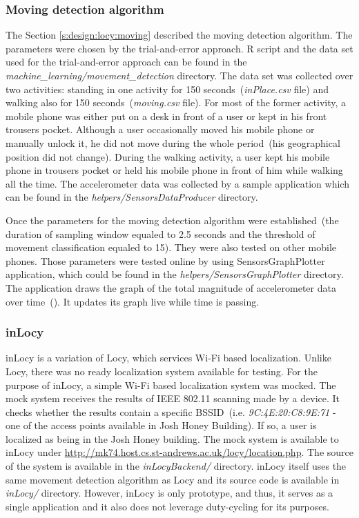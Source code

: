 \subsubsection{Moving detection algorithm}
\label{s:implementation:moving}
\hspace{10pt} The Section \ref{s:design:locy:moving} described the moving detection algorithm. The parameters were chosen by the trial-and-error approach. R script and the data set used for the trial-and-error approach can be found in the \textit{machine\_learning/movement\_detection} directory. The data set was collected over two activities: standing in one activity for 150 seconds\ (\textit{inPlace.csv} file) and walking also for 150 seconds\ (\textit{moving.csv} file). For most of the former activity, a mobile phone was either put on a desk in front of a user or kept in his front trousers pocket. Although a user occasionally moved his mobile phone or manually unlock it, he did not move during the whole period\ (his geographical position did not change). During the walking activity, a user kept his mobile phone in trousers pocket or held his mobile phone in front of him while walking all the time. The accelerometer data was collected by a sample application which can be found in the \textit{helpers/SensorsDataProducer} directory.

Once the parameters for the moving detection algorithm were established\ (the duration of sampling window equaled to 2.5 seconds and the threshold of movement classification equaled to 15). They were also tested on other mobile phones. Those parameters were tested online by using SensorsGraphPlotter application, which could be found in the \textit{helpers/SensorsGraphPlotter} directory. The application draws the graph of the total magnitude of accelerometer data over time\ (). It updates its graph live while time is passing.


\subsubsection{inLocy}
\hspace{10pt} inLocy is a variation of Locy, which services Wi-Fi based localization. Unlike Locy, there was no ready localization system available for testing. For the purpose of inLocy, a simple Wi-Fi based localization system was mocked. The mock system receives the results of IEEE 802.11 scanning made by a device. It checks whether the results contain a specific BSSID\ (i.e. \textit{9C:4E:20:C8:9E:71} - one of the access points available in Josh Honey Building). If so, a user is localized as being in the Josh Honey building. The mock system is available to inLocy under \url{http://mk74.host.cs.st-andrews.ac.uk/locy/location.php}. The source of the system is available in the \textit{inLocyBackend/} directory. inLocy itself uses the same movement detection algorithm as Locy and its source code is available in \textit{inLocy/} directory. However, inLocy is only prototype, and thus, it serves as a single application and it also does not leverage duty-cycling for its purposes. 

